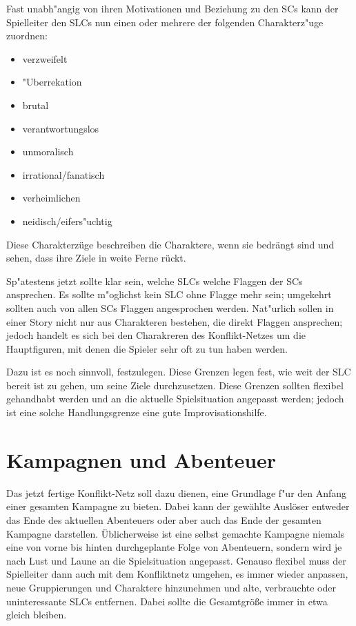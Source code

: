 Fast unabh"angig von ihren Motivationen und Beziehung zu den SCs kann der Spielleiter den SLCs nun einen oder mehrere der folgenden Charakterz"uge zuordnen:
\begin{itemize}
  \item verzweifelt
  \item "Uberrekation
  \item brutal
  \item verantwortungslos
  \item unmoralisch
  \item irrational/fanatisch
  \item verheimlichen
  \item neidisch/eifers"uchtig
\end{itemize}
Diese Charakterzüge beschreiben die Charaktere, wenn sie bedrängt sind und sehen, dass ihre Ziele in weite Ferne rückt.

Sp"atestens jetzt sollte klar sein, welche SLCs welche Flaggen der SCs ansprechen. Es sollte m"oglichst kein SLC ohne Flagge mehr sein; umgekehrt sollten auch von allen SCs Flaggen angesprochen werden. Nat"urlich sollen in einer Story nicht nur aus Charakteren bestehen, die direkt Flaggen ansprechen; jedoch handelt es sich bei den Charakreren des Konflikt-Netzes um die Hauptfiguren, mit denen die Spieler sehr oft zu tun haben werden.

Dazu ist es noch sinnvoll,  festzulegen. Diese Grenzen legen fest, wie weit der SLC bereit ist zu gehen, um seine Ziele durchzusetzen. Diese Grenzen sollten flexibel gehandhabt werden und an die aktuelle Spielsituation angepasst werden; jedoch ist eine solche Handlungsgrenze eine gute Improvisationshilfe. 




\section{Kampagnen und Abenteuer}
Das jetzt fertige Konflikt-Netz soll dazu dienen, eine Grundlage f"ur den Anfang einer gesamten Kampagne zu bieten. Dabei kann der gewählte Auslöser entweder das Ende des aktuellen Abenteuers oder aber auch das Ende der gesamten Kampagne darstellen. Üblicherweise ist eine selbst gemachte Kampagne niemals eine von vorne bis hinten durchgeplante Folge von Abenteuern, sondern wird je nach Lust und Laune an die Spielsituation angepasst. Genauso flexibel muss der Spielleiter dann auch mit dem Konfliktnetz umgehen, es immer wieder anpassen, neue Gruppierungen und Charaktere hinzunehmen und alte, verbrauchte oder uninteressante SLCs entfernen. Dabei sollte die Gesamtgröße immer in etwa gleich bleiben.

